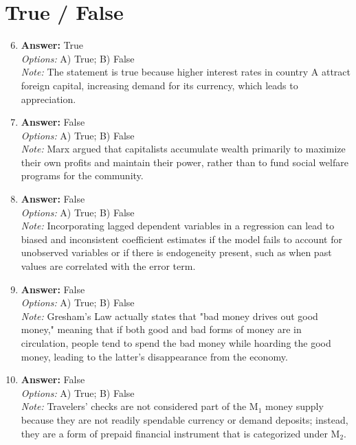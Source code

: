 \documentclass[12pt]{article}
\begin{document}
\section*{True / False}
\begin{enumerate}[label=\arabic*.]
\setcounter{enumi}{5}
\item \textbf{Answer:} True
\\ \textit{Options:} A) True; B) False
\\ \textit{Note:} The statement is true because higher interest rates in country A attract foreign capital, increasing demand for its currency, which leads to appreciation.
\item \textbf{Answer:} False
\\ \textit{Options:} A) True; B) False
\\ \textit{Note:} Marx argued that capitalists accumulate wealth primarily to maximize their own profits and maintain their power, rather than to fund social welfare programs for the community.
\item \textbf{Answer:} False
\\ \textit{Options:} A) True; B) False
\\ \textit{Note:} Incorporating lagged dependent variables in a regression can lead to biased and inconsistent coefficient estimates if the model fails to account for unobserved variables or if there is endogeneity present, such as when past values are correlated with the error term.
\item \textbf{Answer:} False
\\ \textit{Options:} A) True; B) False
\\ \textit{Note:} Gresham's Law actually states that "bad money drives out good money," meaning that if both good and bad forms of money are in circulation, people tend to spend the bad money while hoarding the good money, leading to the latter's disappearance from the economy.
\item \textbf{Answer:} False
\\ \textit{Options:} A) True; B) False
\\ \textit{Note:} Travelers' checks are not considered part of the M$_{1}$ money supply because they are not readily spendable currency or demand deposits; instead, they are a form of prepaid financial instrument that is categorized under M$_{2}$.
\end{enumerate}
\end{document}

